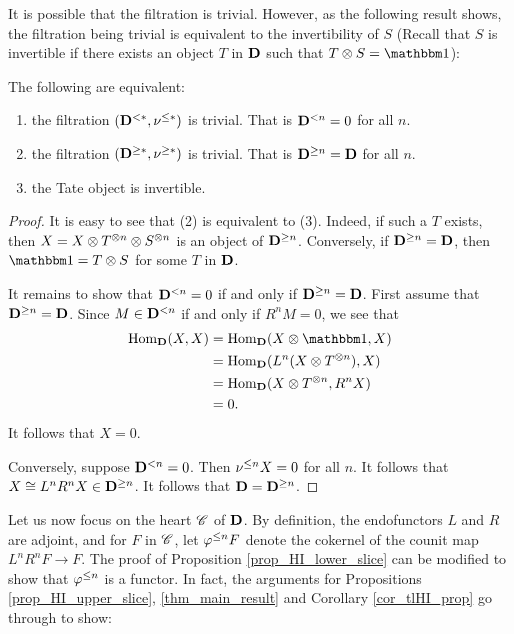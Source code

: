 It is possible that the filtration is trivial. However, as the
following result shows, the filtration being trivial is equivalent
to the invertibility of $S$ (Recall that $S$ is invertible if 
there exists an object $T$ in $\mathbf{D}$ such that $T \tensor S = 
\Unit$):

\begin{prop}\label{prop_filt_trivial_cond}
The following are equivalent:
\begin{enumerate}
\item the filtration $(\mathbf{D}^{< *}, \nu^{\leq *})$ is trivial. 
That is $\mathbf{D}^{< n} = 0$ for all $n$.

\item the filtration $(\mathbf{D}^{\geq *}, \nu^{\geq *})$ is trivial.
That is $\mathbf{D}^{\geq n} = \mathbf{D}$ for all $n$.

\item the Tate object is invertible.
\end{enumerate}
\end{prop}
\begin{proof}
It is easy to see that (2) is equivalent to (3). Indeed, if such
a $T$ exists, then $X = X \otimes T^{\otimes n} \otimes 
S^{\otimes n}$ is an object of $\mathbf{D}^{\geq n}$. Conversely, if
$\mathbf{D}^{\geq n} = \mathbf{D}$, then $\Unit = T \tensor S$ for some
$T$ in $\mathbf{D}$.

It remains to show that $\mathbf{D}^{< n} = 0$ if and only if
$\mathbf{D}^{\geq n} = \mathbf{D}$. First assume that $\mathbf{D}^{\geq n} = 
\mathbf{D}$. Since $M \in \mathbf{D}^{< n}$ if and only if $R^n M = 0$,
we see that
\begin{align*}
\hom_{\DCat}(X, X) &= \hom_{\DCat}(X \tensor \Unit, X) \\
&= \hom_{\DCat}(L^n(X \tensor T^{\tensor n}), X) \\
&= \hom_{\DCat}(X \tensor T^{\tensor n}, R^n X) \\
&= 0.
\end{align*}
It follows that $X = 0$.

Conversely, suppose $\mathbf{D}^{< n} = 0$. Then $\nu^{\leq n}X = 0$
for all $n$. It follows that $X \cong L^n R^n X \in 
\mathbf{D}^{\geq n}$. It follows that $\mathbf{D} = \mathbf{D}^{\geq n}$.
\end{proof}

Let us now focus on the heart $\mathscr{C}$ of $\mathbf{D}$. By definition,
the endofunctors $L$ and $R$ are adjoint, and for $F$ in 
$\mathscr{C}$, let $\varphi^{\leq n} F$ denote the cokernel of the counit map 
$L^n R^n F \to F$. The proof of Proposition \ref{prop_HI_lower_slice} can be
modified to show that $\varphi^{\leq n}$ is a functor. In fact, the 
arguments for Propositions \ref{prop_HI_upper_slice}, \ref{thm_main_result} and 
Corollary \ref{cor_tlHI_prop} go through to show:

